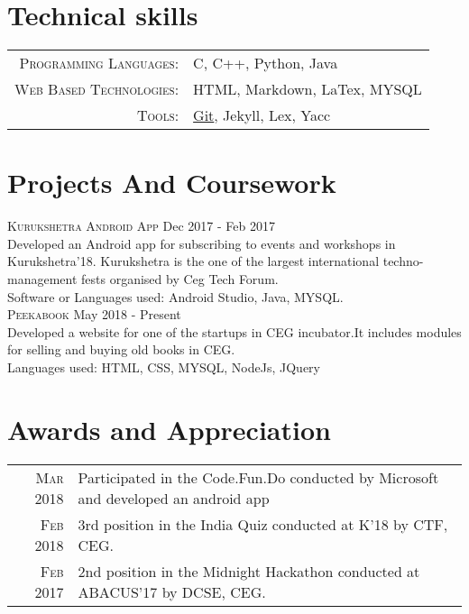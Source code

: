 \documentclass[a4paper,10pt]{article}
\begin{document}
\section{Technical skills}
\begin{tabular}{rl}
 \textsc{Programming Languages:}& C, C++, Python, Java\\
\textsc{Web Based Technologies:}& HTML, Markdown, LaTex, MYSQL\\
\textsc{Tools:}&  \href{https://github.com/kullsno2}{Git}, Jekyll, Lex, Yacc\\
\end{tabular}

\section{Projects And Coursework}
\textsc{Kurukshetra Android App} \hfill Dec 2017 - Feb 2017 \\
Developed an Android app for subscribing to events and workshops in Kurukshetra'18. Kurukshetra is the one of the largest international techno-management fests organised by Ceg Tech Forum.\\
Software or Languages used: Android Studio, Java, MYSQL. \\

\textsc{Peekabook} \hfill May 2018 - Present \\
 Developed a website for one of the startups in CEG incubator.It includes modules for selling and buying old books in CEG.\\
Languages used: HTML, CSS, MYSQL, NodeJs, JQuery
\section{Awards and Appreciation}
\begin{tabular}{rl}

\textsc{Mar} 2018 &Participated in the Code.Fun.Do conducted by Microsoft and developed an android app \\
 \textsc{Feb} 2018 & 3rd position in the India Quiz conducted at K'18 by CTF, CEG. \\
 \textsc{Feb} 2017 &2nd position in the Midnight Hackathon conducted at  ABACUS’17 by DCSE, CEG.

\end{tabular}
\end{document}

